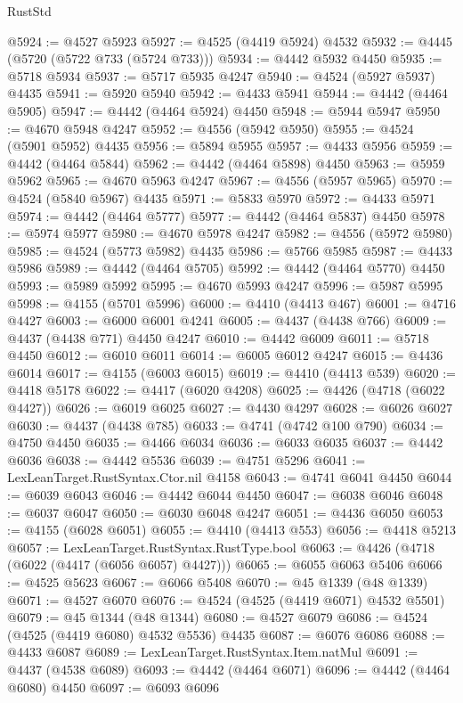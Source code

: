 \begin{lexlean}{RustStd}
\begin{coremodule}
@5924 := @4527 @5923
@5927 := @4525 (@4419 @5924) @4532
@5932 := @4445 (@5720 (@5722 @733 (@5724 @733)))
@5934 := @4442 @5932 @4450
@5935 := @5718 @5934
@5937 := @5717 @5935 @4247
@5940 := @4524 (@5927 @5937) @4435
@5941 := @5920 @5940
@5942 := @4433 @5941
@5944 := @4442 (@4464 @5905)
@5947 := @4442 (@4464 @5924) @4450
@5948 := @5944 @5947
@5950 := @4670 @5948 @4247
@5952 := @4556 (@5942 @5950)
@5955 := @4524 (@5901 @5952) @4435
@5956 := @5894 @5955
@5957 := @4433 @5956
@5959 := @4442 (@4464 @5844)
@5962 := @4442 (@4464 @5898) @4450
@5963 := @5959 @5962
@5965 := @4670 @5963 @4247
@5967 := @4556 (@5957 @5965)
@5970 := @4524 (@5840 @5967) @4435
@5971 := @5833 @5970
@5972 := @4433 @5971
@5974 := @4442 (@4464 @5777)
@5977 := @4442 (@4464 @5837) @4450
@5978 := @5974 @5977
@5980 := @4670 @5978 @4247
@5982 := @4556 (@5972 @5980)
@5985 := @4524 (@5773 @5982) @4435
@5986 := @5766 @5985
@5987 := @4433 @5986
@5989 := @4442 (@4464 @5705)
@5992 := @4442 (@4464 @5770) @4450
@5993 := @5989 @5992
@5995 := @4670 @5993 @4247
@5996 := @5987 @5995
@5998 := @4155 (@5701 @5996)
@6000 := @4410 (@4413 @467)
@6001 := @4716 @4427
@6003 := @6000 @6001 @4241
@6005 := @4437 (@4438 @766)
@6009 := @4437 (@4438 @771) @4450 @4247
@6010 := @4442 @6009
@6011 := @5718 @4450
@6012 := @6010 @6011
@6014 := @6005 @6012 @4247
@6015 := @4436 @6014
@6017 := @4155 (@6003 @6015)
@6019 := @4410 (@4413 @539)
@6020 := @4418 @5178
@6022 := @4417 (@6020 @4208)
@6025 := @4426 (@4718 (@6022 @4427))
@6026 := @6019 @6025
@6027 := @4430 @4297
@6028 := @6026 @6027
@6030 := @4437 (@4438 @785)
@6033 := @4741 (@4742 @100 @790)
@6034 := @4750 @4450
@6035 := @4466 @6034
@6036 := @6033 @6035
@6037 := @4442 @6036
@6038 := @4442 @5536
@6039 := @4751 @5296
@6041 := LexLeanTarget.RustSyntax.Ctor.nil @4158
@6043 := @4741 @6041 @4450
@6044 := @6039 @6043
@6046 := @4442 @6044 @4450
@6047 := @6038 @6046
@6048 := @6037 @6047
@6050 := @6030 @6048 @4247
@6051 := @4436 @6050
@6053 := @4155 (@6028 @6051)
@6055 := @4410 (@4413 @553)
@6056 := @4418 @5213
@6057 := LexLeanTarget.RustSyntax.RustType.bool
@6063 := @4426 (@4718 (@6022 (@4417 (@6056 @6057) @4427)))
@6065 := @6055 @6063 @5406
@6066 := @4525 @5623
@6067 := @6066 @5408
@6070 := @45 @1339 (@48 @1339)
@6071 := @4527 @6070
@6076 := @4524 (@4525 (@4419 @6071) @4532 @5501)
@6079 := @45 @1344 (@48 @1344)
@6080 := @4527 @6079
@6086 := @4524 (@4525 (@4419 @6080) @4532 @5536) @4435
@6087 := @6076 @6086
@6088 := @4433 @6087
@6089 := LexLeanTarget.RustSyntax.Item.natMul
@6091 := @4437 (@4538 @6089)
@6093 := @4442 (@4464 @6071)
@6096 := @4442 (@4464 @6080) @4450
@6097 := @6093 @6096

\end{coremodule}
\end{lexlean}
